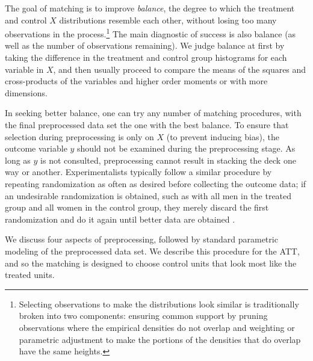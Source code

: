 \documentclass[11pt,titlepage]{article}
\begin{document}
The goal of matching is to improve \emph{balance}, the degree to which
the treatment and control $X$ distributions resemble each other,
without losing too many observations in the
process.\footnote{Selecting observations to make the distributions
  look similar is traditionally broken into two components: ensuring
  common support by pruning observations where the empirical densities
  do not overlap and weighting or parametric adjustment to make the
  portions of the densities that do overlap have the same heights.}
The main diagnostic of success is also balance (as well as the number
of observations remaining).  We judge balance at first by taking the
difference in the treatment and control group histograms for each
variable in $X$, and then usually proceed to compare the means of the
squares and cross-products of the variables and higher order moments
or with more dimensions.

In seeking better balance, one can try any number of matching
procedures, with the final preprocessed data set the one with the best
balance.  To ensure that selection during preprocessing is only on $X$
(to prevent inducing bias), the outcome variable $y$ should not be
examined during the preprocessing stage.  As long as $y$ is not
consulted, preprocessing cannot result in stacking the deck one way or
another.  Experimentalists typically follow a similar procedure by
repeating randomization as often as desired before collecting the
outcome data; if an undesirable randomization is obtained, such as
with all men in the treated group and all women in the control group,
they merely discard the first randomization and do it again until
better data are obtained \citep[see][]{Rubin01}.

We discuss four aspects of preprocessing, followed by standard
parametric modeling of the preprocessed data set.  We describe this
procedure for the ATT, and so the matching is designed to choose
control units that look most like the treated units.
\end{document}
